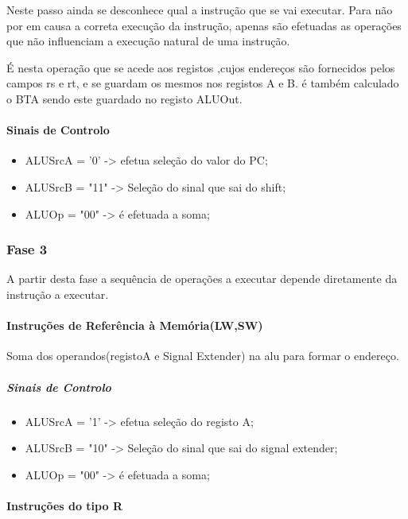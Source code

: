 \documentclass[10pt,a4paper]{book}
\begin{document}
			Neste passo ainda se desconhece qual a instrução que se vai executar. Para não por em causa a correta execução da instrução, apenas são efetuadas as operações que não influenciam a execução natural de uma instrução.

			É nesta operação que se acede aos registos ,cujos endereços são fornecidos pelos campos rs e rt, e se guardam os mesmos nos registos A e B. é também calculado o BTA sendo este guardado no registo ALUOut.

			\paragraph{Sinais de Controlo}

			\begin{itemize}
				\item ALUSrcA = '0' -> efetua seleção do valor do PC;
				\item ALUSrcB = "11" -> Seleção do sinal que sai do shift;
				\item ALUOp = "00" -> é efetuada a soma;
			\end{itemize}


			\subsubsection{Fase 3}

			A partir desta fase a sequência de operações a executar depende diretamente da instrução a executar.

			\paragraph{Instruções de Referência à Memória(LW,SW)}

			Soma dos operandos(registoA e Signal Extender) na alu para formar o endereço.

			\subparagraph{Sinais de Controlo}

			\begin{itemize}
				\item ALUSrcA = '1' -> efetua seleção do registo A;
				\item ALUSrcB = "10" -> Seleção do sinal que sai do signal extender;
				\item ALUOp = "00" -> é efetuada a soma;
			\end{itemize}



			\paragraph{Instruções do tipo R}
\end{document}
